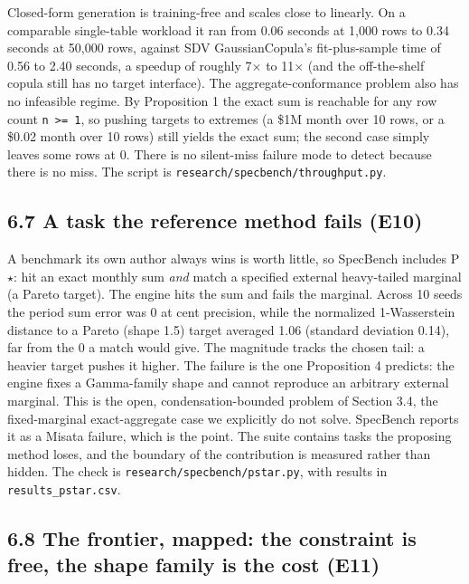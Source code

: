 Closed-form generation is training-free and scales close to linearly. On
a comparable single-table workload it ran from 0.06 seconds at 1,000
rows to 0.34 seconds at 50,000 rows, against SDV GaussianCopula's
fit-plus-sample time of 0.56 to 2.40 seconds, a speedup of roughly
7\ensuremath{\times} to 11\ensuremath{\times} (and the off-the-shelf
copula still has no target interface). The aggregate-conformance problem
also has no infeasible regime. By Proposition 1 the exact sum is
reachable for any row count \texttt{n\ \textgreater{}=\ 1}, so pushing
targets to extremes (a \$1M month over 10 rows, or a \$0.02 month over
10 rows) still yields the exact sum; the second case simply leaves some
rows at 0. There is no silent-miss failure mode to detect because there
is no miss. The script is \texttt{research/\allowbreak{}specbench/\allowbreak{}throughput.py}.

\hypertarget{a-task-the-reference-method-fails-e10}{%
\subsection{6.7 A task the reference method fails
(E10)}\label{a-task-the-reference-method-fails-e10}}

A benchmark its own author always wins is worth little, so SpecBench
includes P\ensuremath{\star}: hit an exact monthly sum \emph{and} match
a specified external heavy-tailed marginal (a Pareto target). The engine
hits the sum and fails the marginal. Across 10 seeds the period sum
error was 0 at cent precision, while the normalized 1-Wasserstein
distance to a Pareto (shape 1.5) target averaged 1.06 (standard
deviation 0.14), far from the 0 a match would give. The magnitude tracks
the chosen tail: a heavier target pushes it higher. The failure is the
one Proposition 4 predicts: the engine fixes a Gamma-family shape and
cannot reproduce an arbitrary external marginal. This is the open,
condensation-bounded problem of Section 3.4, the fixed-marginal
exact-aggregate case we explicitly do not solve. SpecBench reports it as
a Misata failure, which is the point. The suite contains tasks the
proposing method loses, and the boundary of the contribution is measured
rather than hidden. The check is \texttt{research/\allowbreak{}specbench/\allowbreak{}pstar.py},
with results in \texttt{results\_\allowbreak{}pstar.csv}.

\hypertarget{the-frontier-mapped-the-constraint-is-free-the-shape-family-is-the-cost-e11}{%
\subsection{6.8 The frontier, mapped: the constraint is free, the shape
family is the cost
(E11)}\label{the-frontier-mapped-the-constraint-is-free-the-shape-family-is-the-cost-e11}}

